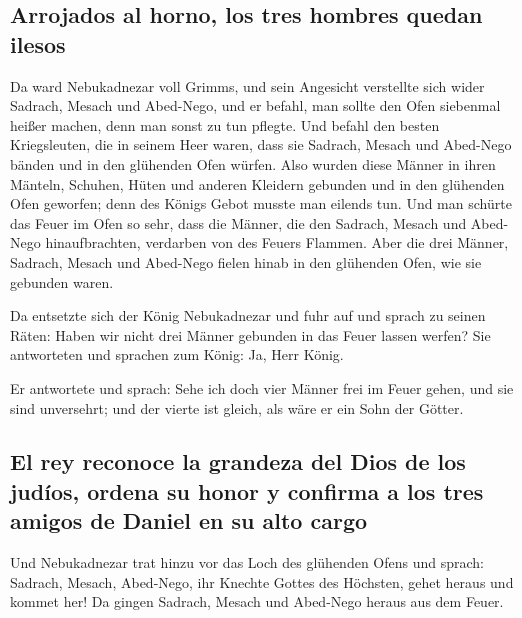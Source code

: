 \hypertarget{arrojados-al-horno-los-tres-hombres-quedan-ilesos}{%
\subsection{Arrojados al horno, los tres hombres quedan
ilesos}\label{arrojados-al-horno-los-tres-hombres-quedan-ilesos}}

 Da ward Nebukadnezar voll Grimms, und sein Angesicht
verstellte sich wider Sadrach, Mesach und Abed-Nego, und er befahl, man
sollte den Ofen siebenmal heißer machen, denn man sonst zu tun pflegte.
 Und befahl den besten Kriegsleuten, die in seinem Heer
waren, dass sie Sadrach, Mesach und Abed-Nego bänden und in den
glühenden Ofen würfen.  Also wurden diese Männer in ihren
Mänteln, Schuhen, Hüten und anderen Kleidern gebunden und in den
glühenden Ofen geworfen;  denn des Königs Gebot musste
man eilends tun. Und man schürte das Feuer im Ofen so sehr, dass die
Männer, die den Sadrach, Mesach und Abed-Nego hinaufbrachten, verdarben
von des Feuers Flammen.  Aber die drei Männer, Sadrach,
Mesach und Abed-Nego fielen hinab in den glühenden Ofen, wie sie
gebunden waren.

 Da entsetzte sich der König Nebukadnezar und fuhr auf
und sprach zu seinen Räten: Haben wir nicht drei Männer gebunden in das
Feuer lassen werfen? Sie antworteten und sprachen zum König: Ja, Herr
König.

 Er antwortete und sprach: Sehe ich doch vier Männer frei
im Feuer gehen, und sie sind unversehrt; und der vierte ist gleich, als
wäre er ein Sohn der Götter.

\hypertarget{el-rey-reconoce-la-grandeza-del-dios-de-los-juduxedos-ordena-su-honor-y-confirma-a-los-tres-amigos-de-daniel-en-su-alto-cargo}{%
\subsection{El rey reconoce la grandeza del Dios de los judíos, ordena
su honor y confirma a los tres amigos de Daniel en su alto
cargo}\label{el-rey-reconoce-la-grandeza-del-dios-de-los-juduxedos-ordena-su-honor-y-confirma-a-los-tres-amigos-de-daniel-en-su-alto-cargo}}

 Und Nebukadnezar trat hinzu vor das Loch des glühenden
Ofens und sprach: Sadrach, Mesach, Abed-Nego, ihr Knechte Gottes des
Höchsten, gehet heraus und kommet her! Da gingen Sadrach, Mesach und
Abed-Nego heraus aus dem Feuer.

